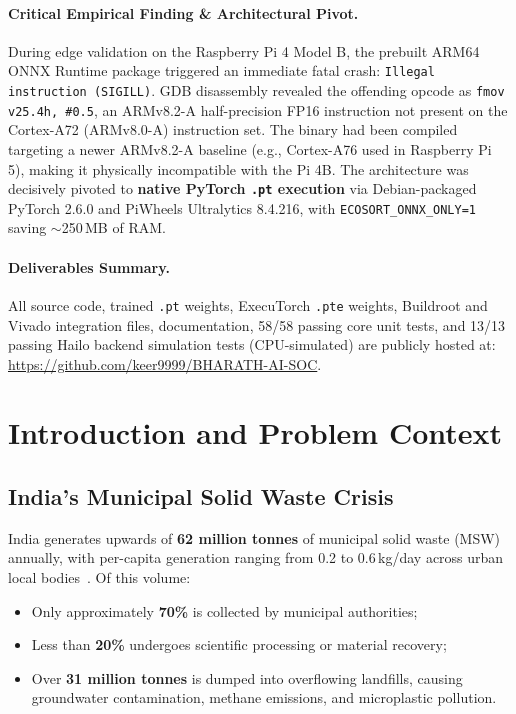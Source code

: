 \documentclass[12pt,a4paper]{article}
\begin{document}
\paragraph{Critical Empirical Finding \& Architectural Pivot.}
During edge validation on the Raspberry Pi 4 Model B, the prebuilt ARM64 ONNX Runtime
package triggered an immediate fatal crash: \texttt{Illegal instruction (SIGILL)}. GDB
disassembly revealed the offending opcode as \texttt{fmov v25.4h, \#0.5}, an ARMv8.2-A
half-precision FP16 instruction not present on the Cortex-A72 (ARMv8.0-A) instruction
set. The binary had been compiled targeting a newer ARMv8.2-A baseline (e.g., Cortex-A76
used in Raspberry Pi 5), making it physically incompatible with the Pi 4B. The architecture
was decisively pivoted to \textbf{native PyTorch \texttt{.pt} execution} via Debian-packaged
PyTorch 2.6.0 and PiWheels Ultralytics 8.4.216, with \texttt{ECOSORT\_ONNX\_ONLY=1} saving
$\sim$250\,MB of RAM.

\paragraph{Deliverables Summary.}
All source code, trained \texttt{.pt} weights, ExecuTorch \texttt{.pte} weights, Buildroot
and Vivado integration files, documentation, 58/58 passing core unit tests, and 13/13
passing Hailo backend simulation tests (CPU-simulated) are publicly hosted at:
\url{https://github.com/keer9999/BHARATH-AI-SOC}.

\clearpage

\section{Introduction and Problem Context}

\subsection{India's Municipal Solid Waste Crisis}

India generates upwards of \textbf{62 million tonnes} of municipal solid waste (MSW)
annually, with per-capita generation ranging from 0.2 to 0.6\,kg/day across urban local
bodies~\cite{mpcb2022, cpcb2020}. Of this volume:
\begin{itemize}
  \item Only approximately \textbf{70\%} is collected by municipal authorities;
  \item Less than \textbf{20\%} undergoes scientific processing or material recovery;
  \item Over \textbf{31 million tonnes} is dumped into overflowing landfills, causing
  groundwater contamination, methane emissions, and microplastic pollution.
\end{itemize}
\end{document}
